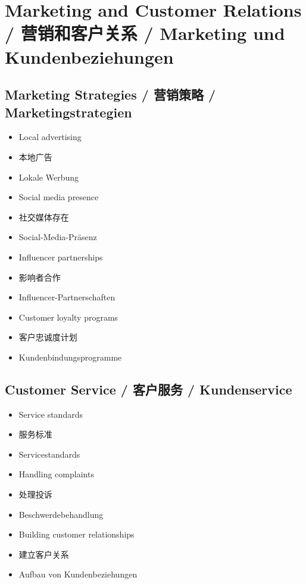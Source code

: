 \section{Marketing and Customer Relations / 营销和客户关系 / Marketing und Kundenbeziehungen}

\subsection{Marketing Strategies / 营销策略 / Marketingstrategien}
\begin{itemize}
    \item Local advertising
    \item 本地广告
    \item Lokale Werbung
    \item Social media presence
    \item 社交媒体存在
    \item Social-Media-Präsenz
    \item Influencer partnerships
    \item 影响者合作
    \item Influencer-Partnerschaften
    \item Customer loyalty programs
    \item 客户忠诚度计划
    \item Kundenbindungsprogramme
\end{itemize}

\subsection{Customer Service / 客户服务 / Kundenservice}
\begin{itemize}
    \item Service standards
    \item 服务标准
    \item Servicestandards
    \item Handling complaints
    \item 处理投诉
    \item Beschwerdebehandlung
    \item Building customer relationships
    \item 建立客户关系
    \item Aufbau von Kundenbeziehungen
\end{itemize}
